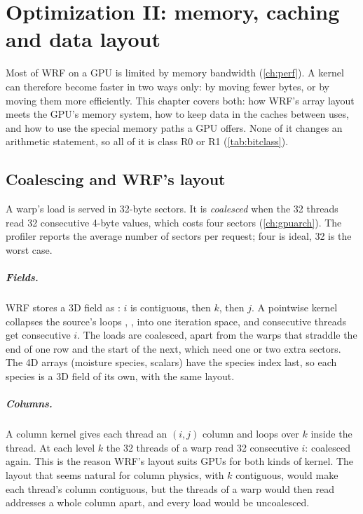\chapter{Optimization II: memory, caching and data layout}\label{ch:memory}

Most of WRF on a GPU is limited by memory bandwidth (\cref{ch:perf}). A kernel can therefore become faster in two
ways only: by moving fewer bytes, or by moving them more efficiently. This chapter covers both: how WRF's array
layout meets the GPU's memory system, how to keep data in the caches between uses, and how to use the special memory
paths a GPU offers. None of it changes an arithmetic statement, so all of it is class R0 or R1 (\cref{tab:bitclass}).

\section{Coalescing and WRF's layout}

A warp's load is served in 32-byte sectors. It is \emph{coalesced} when the 32 threads read 32 consecutive 4-byte
values, which costs four sectors (\cref{ch:gpuarch}). The profiler reports the average number of sectors per request;
four is ideal, 32 is the worst case.

\paragraph{Fields.} WRF stores a 3D field as : $i$ is contiguous, then $k$, then
$j$. A pointwise kernel collapses the source's loops , ,  into one iteration space, and
consecutive threads get consecutive $i$. The loads are coalesced, apart from the warps that straddle the end of one
row and the start of the next, which need one or two extra sectors. The 4D arrays (moisture species, scalars) have the
species index last, so each species is a 3D field of its own, with the same layout.

\paragraph{Columns.} A column kernel gives each thread an $(i,j)$ column and loops over $k$ inside the thread. At each
level $k$ the 32 threads of a warp read 32 consecutive $i$: coalesced again. This is the reason WRF's layout suits
GPUs for both kinds of kernel. The layout that seems natural for column physics, with $k$ contiguous, would make each
thread's column contiguous, but the threads of a warp would then read addresses a whole column apart, and every load
would be uncoalesced.

